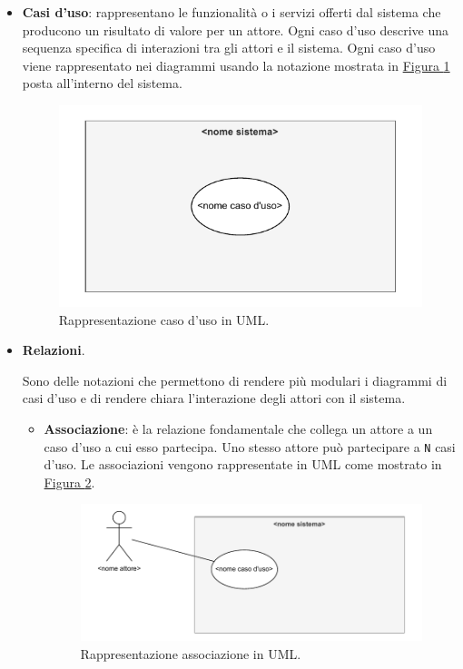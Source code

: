 \begin{itemize}
    \item \textbf{Casi d'uso}: rappresentano le funzionalità o i servizi offerti dal sistema che producono un risultato di valore per un attore. Ogni caso d'uso descrive una sequenza specifica di interazioni tra gli attori e il sistema.
    Ogni caso d'uso viene rappresentato nei diagrammi usando la notazione mostrata in \hyperref[fig:caso_uso]{Figura \ref{fig:caso_uso}} posta all'interno del sistema.
    \begin{figure}[H]
        \centering
        \includegraphics{Sezioni/ProcessiPrimari/Immagini/caso_uso.pdf}
        \caption{Rappresentazione caso d'uso in UML.}
        \label{fig:caso_uso}
    \end{figure}
    
    \item \textbf{Relazioni}.
    
    Sono delle notazioni che permettono di rendere più modulari i diagrammi di casi d'uso e di rendere chiara l'interazione degli attori con il sistema.
    
    \begin{itemize}
        \item \textbf{Associazione}: è la relazione fondamentale che collega un attore a un caso d'uso a cui esso partecipa.
        Uno stesso attore può partecipare a \texttt{N} casi d'uso.
        Le associazioni vengono rappresentate in UML come mostrato in \hyperref[fig:associazione_uml]{Figura \ref{fig:associazione_uml}}.
        \begin{figure}[H]
            \centering
            \includegraphics{Sezioni/ProcessiPrimari/Immagini/associazione_uml.pdf}
            \caption{Rappresentazione associazione in UML.}
            \label{fig:associazione_uml}
        \end{figure}


\end{itemize}
\end{itemize}
